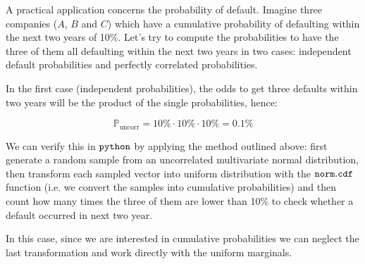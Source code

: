 A practical application concerns the probability of default. 
Imagine three companies ($A$, $B$ and $C$) which have a
cumulative probability of defaulting within the next two years of 10\%.
Let's try to compute the probabilities to have the three of them all
defaulting within the next two years in two cases: independent default probabilities and perfectly correlated probabilities.

In the first case (independent probabilities), the
odds to get three defaults within two years will be the product
of the single probabilities, hence:

\[\mathbb{P}_{\mathrm{uncorr}} = 10\% \cdot 10\% \cdot 10\% = 0.1 \%\]

We can verify this in \(\tt{python}\) by applying the method outlined above: first generate a random sample from an uncorrelated multivariate normal distribution, then transform each sampled vector into uniform distribution with the \(\tt{norm.cdf}\) function (i.e. we
convert the samples into cumulative probabilities) and then count how many times the
three of them are lower than 10\% to check whether a default occurred in next two year.

In this case, since we are interested in cumulative probabilities we can neglect the last transformation and work directly with the 
uniform marginals.

